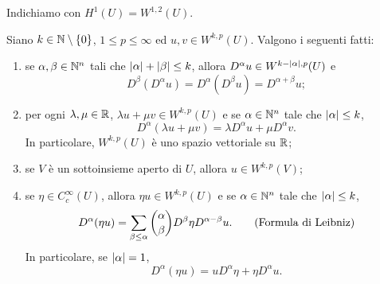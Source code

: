 \begin{notazione}
	Indichiamo con $H^{1}(U) = W^{1,2}(U)$.
\end{notazione}

\begin{proposizione}\label{propderivatedeboli}
	Siano $k \in \mathbb{N}\setminus\left\lbrace 0\right\rbrace $, $1 \le p \le \infty$ ed $u,v \in W^{k,p}(U)$.  Valgono i seguenti fatti:
	\begin{enumerate}[$(a)$]
		\item se $\alpha, \beta \in \mathbb{N}^n$ tali che $\lvert\alpha\rvert + \lvert\beta\rvert \le k$, allora $D^\alpha u \in W^{k - \lvert\alpha\rvert,p}(U)$ e 
		\[ D^\beta (D^\alpha u) = D^\alpha (D^\beta u) = D^{\alpha + \beta} u;  \]
		\item per ogni $\lambda,\mu \in \mathbb{R}$, $\lambda u + \mu v \in W^{k,p}(U)$ e se $\alpha \in \mathbb{N}^n$ tale che $\lvert\alpha\rvert\le k$,
		\[ D^\alpha (\lambda u + \mu v )= \lambda D^\alpha u + \mu D^\alpha v. \]
		In particolare, $W^{k,p}(U)$ è uno spazio vettoriale su $\mathbb{R}$;
		\item se $V$ è un sottoinsieme aperto di $U$, allora $u \in W^{k,p}(V)$;
		\item  se $\eta \in C^\infty_c(U)$, allora $\eta u \in W^{k,p}(U)$ e se $\alpha \in \mathbb{N}^n$ tale che $\lvert\alpha\rvert\le k$,
		\[ D^\alpha(\eta u) = \sum_{\beta \le \alpha}^{} \binom{\alpha}{\beta} D^\beta \eta D^{\alpha - \beta} u. \qquad \textup{(Formula di Leibniz)} \]
		In particolare, se $\lvert\alpha\rvert = 1$, 
		\[ D^\alpha(\eta u) = u D^\alpha \eta + \eta D^\alpha u. \]
	\end{enumerate}
\end{proposizione}
